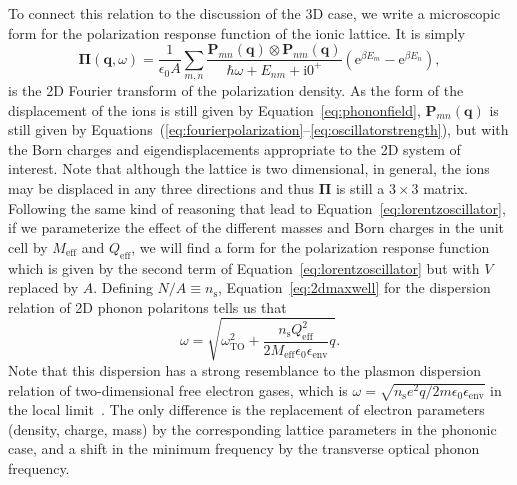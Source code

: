 \documentclass[aps,prb,twocolumn,
	groupedaddress,superscriptaddress,
	amsfonts,amssymb,amsmath,floatfix,
	citeautoscript]{revtex4-1}
\newcommand{\iu}{\mathrm{i}}
\newcommand{\e}{\mathrm{e}}
\begin{document}
To connect this relation to the discussion of the 3D case, we write a microscopic form for the polarization response function of the ionic lattice. It is simply
\begin{equation}\label{eq:2dsusceptibility}
\boldsymbol{\Pi}(\mathbf{q},\omega) =  \frac{1}{\epsilon_0 A}\sum\limits_{m,n}\frac{\mathbf{P}_{mn}(\mathbf{q})\otimes\mathbf{P}_{nm}(\mathbf{q})}{\hbar\omega + E_{nm}+\iu 0^+}\left(\e^{\beta E_m}-\e^{\beta E_n} \right),
\end{equation}
is the 2D Fourier transform of the polarization density. As the form of the displacement of the ions is still given by Equation~\eqref{eq:phononfield}, $\mathbf{P}_{mn}(\mathbf{q})$ is still given by Equations~(\ref{eq:fourierpolarization}--\ref{eq:oscillatorstrength}), but with the Born charges and eigendisplacements appropriate to the 2D system of interest. Note that although the lattice is two dimensional, in general, the ions may be displaced in any three directions and thus $\boldsymbol{\Pi}$ is still a $3\times3$ matrix.
Following the same kind of reasoning that lead to Equation~\eqref{eq:lorentzoscillator}, if we parameterize the effect of the different masses and Born charges in the unit cell by $M_{\mathrm{eff}}$ and $Q_{\mathrm{eff}}$, we will find a form for the polarization response function which is given by the second term of Equation~\eqref{eq:lorentzoscillator} but with $V$ replaced by $A$. Defining $N/A \equiv n_{\mathrm{s}}$, Equation~\eqref{eq:2dmaxwell} for the dispersion relation of 2D phonon polaritons tells us that
\begin{equation}\label{eq:2dphononpolaritondispersion}
\omega = \sqrt{\omega_{\mathrm{TO}}^2+\frac{n_{\mathrm{s}}Q_{\mathrm{eff}}^{2}}{2M_{\mathrm{eff}}\epsilon_0\epsilon_{\mathrm{env}}}q}.
\end{equation}
Note that this dispersion has a strong resemblance to the plasmon dispersion relation of two-dimensional free electron gases, which is  $\omega = \sqrt{n_{\mathrm{s}}e^2q/2m\epsilon_0\epsilon_{\mathrm{env}}}$  in the local limit~\cite{stern1967polarizability}.
The only difference is the replacement of electron parameters (density, charge, mass) by the corresponding lattice parameters in the phononic case, and a shift in the minimum frequency by the transverse optical phonon frequency. 
\end{document}
